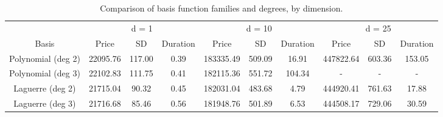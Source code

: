 \begin{table}

\caption{\label{tab:tab:basis_functions}Comparison of basis function families and degrees, by dimension.}
\centering
\begin{tabular}[t]{cccccccccc}
\toprule
\multicolumn{1}{c}{ } & \multicolumn{3}{c}{d = 1} & \multicolumn{3}{c}{d = 10} & \multicolumn{3}{c}{d = 25} \\
\cmidrule(l{3pt}r{3pt}){2-4} \cmidrule(l{3pt}r{3pt}){5-7} \cmidrule(l{3pt}r{3pt}){8-10}
Basis & Price & SD & Duration & Price & SD & Duration & Price & SD & Duration\\
\midrule
Polynomial (deg 2) & 22095.76 & 117.00 & 0.39 & 183335.49 & 509.09 & 16.91 & 447822.64 & 603.36 & 153.05\\
Polynomial (deg 3) & 22102.83 & 111.75 & 0.41 & 182115.36 & 551.72 & 104.34 & - & - & -\\
Laguerre (deg 2) & 21715.04 & 90.32 & 0.45 & 182031.04 & 483.68 & 4.79 & 444920.41 & 761.63 & 17.88\\
Laguerre (deg 3) & 21716.68 & 85.46 & 0.56 & 181948.76 & 501.89 & 6.53 & 444508.17 & 729.06 & 30.59\\
\bottomrule
\end{tabular}
\end{table}
